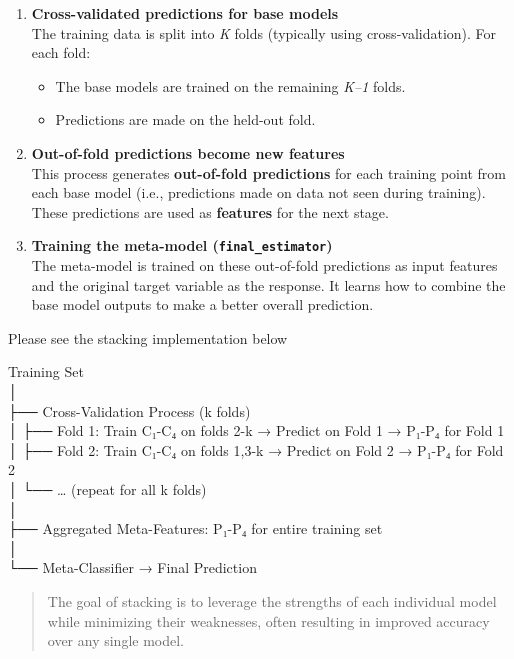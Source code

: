 \documentclass[
  letterpaper,
  DIV=11,
  numbers=noendperiod]{scrreprt}
\providecommand{\tightlist}{%
  \setlength{\itemsep}{0pt}\setlength{\parskip}{0pt}}\usepackage{longtable,booktabs,array}
\begin{document}
\begin{enumerate}
\def\labelenumi{\arabic{enumi}.}
\item
  \textbf{Cross-validated predictions for base models}\\
  The training data is split into \emph{K} folds (typically using
  cross-validation). For each fold:

  \begin{itemize}
  \tightlist
  \item
    The base models are trained on the remaining \emph{K--1} folds.
  \item
    Predictions are made on the held-out fold.
  \end{itemize}
\item
  \textbf{Out-of-fold predictions become new features}\\
  This process generates \textbf{out-of-fold predictions} for each
  training point from each base model (i.e., predictions made on data
  not seen during training). These predictions are used as
  \textbf{features} for the next stage.
\item
  \textbf{Training the meta-model (\texttt{final\_estimator})}\\
  The meta-model is trained on these out-of-fold predictions as input
  features and the original target variable as the response. It learns
  how to combine the base model outputs to make a better overall
  prediction.
\end{enumerate}

Please see the stacking implementation below

Training Set\\
│\\
├── Cross-Validation Process (k folds)\\
│ ├── Fold 1: Train C₁-C₄ on folds 2-k → Predict on Fold 1 → P₁-P₄ for
Fold 1\\
│ ├── Fold 2: Train C₁-C₄ on folds 1,3-k → Predict on Fold 2 → P₁-P₄ for
Fold 2\\
│ └── \ldots{} (repeat for all k folds)\\
│\\
├── Aggregated Meta-Features: P₁-P₄ for entire training set\\
│\\
└── Meta-Classifier → Final Prediction

\begin{quote}
The goal of stacking is to leverage the strengths of each individual
model while minimizing their weaknesses, often resulting in improved
accuracy over any single model.
\end{quote}
\end{document}
